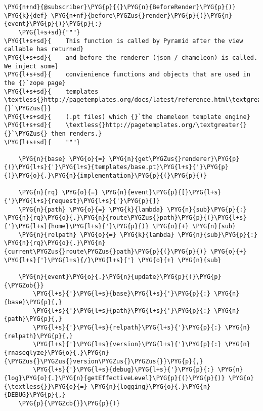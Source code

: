 \begin{Verbatim}[commandchars=\\\{\}]
\PYG{n+nd}{@subscriber}\PYG{p}{(}\PYG{n}{BeforeRender}\PYG{p}{)}
\PYG{k}{def} \PYG{n+nf}{before\PYGZus{}render}\PYG{p}{(}\PYG{n}{event}\PYG{p}{)}\PYG{p}{:}
    \PYG{l+s+sd}{"""}
\PYG{l+s+sd}{    This function is called by Pyramid after the view callable has returned}
\PYG{l+s+sd}{    and before the renderer (json / chameleon) is called. We inject some}
\PYG{l+s+sd}{    convienience functions and objects that are used in the {}`zope page}
\PYG{l+s+sd}{    templates \textless{}http://pagetemplates.org/docs/latest/reference.html\textgreater{}{}`\PYGZus{}}
\PYG{l+s+sd}{    (.pt files) which {}`the chameleon template engine}
\PYG{l+s+sd}{    \textless{}http://pagetemplates.org/\textgreater{}{}`\PYGZus{} then renders.}
\PYG{l+s+sd}{    """}

    \PYG{n}{base} \PYG{o}{=} \PYG{n}{get\PYGZus{}renderer}\PYG{p}{(}\PYG{l+s}{'}\PYG{l+s}{templates/base.pt}\PYG{l+s}{'}\PYG{p}{)}\PYG{o}{.}\PYG{n}{implementation}\PYG{p}{(}\PYG{p}{)}

    \PYG{n}{rq} \PYG{o}{=} \PYG{n}{event}\PYG{p}{[}\PYG{l+s}{'}\PYG{l+s}{request}\PYG{l+s}{'}\PYG{p}{]}
    \PYG{n}{path} \PYG{o}{=} \PYG{k}{lambda} \PYG{n}{sub}\PYG{p}{:} \PYG{n}{rq}\PYG{o}{.}\PYG{n}{route\PYGZus{}path}\PYG{p}{(}\PYG{l+s}{'}\PYG{l+s}{home}\PYG{l+s}{'}\PYG{p}{)} \PYG{o}{+} \PYG{n}{sub}
    \PYG{n}{relpath} \PYG{o}{=} \PYG{k}{lambda} \PYG{n}{sub}\PYG{p}{:} \PYG{n}{rq}\PYG{o}{.}\PYG{n}{current\PYGZus{}route\PYGZus{}path}\PYG{p}{(}\PYG{p}{)} \PYG{o}{+} \PYG{l+s}{'}\PYG{l+s}{/}\PYG{l+s}{'} \PYG{o}{+} \PYG{n}{sub}

    \PYG{n}{event}\PYG{o}{.}\PYG{n}{update}\PYG{p}{(}\PYG{p}{\PYGZob{}}
        \PYG{l+s}{'}\PYG{l+s}{base}\PYG{l+s}{'}\PYG{p}{:} \PYG{n}{base}\PYG{p}{,}
        \PYG{l+s}{'}\PYG{l+s}{path}\PYG{l+s}{'}\PYG{p}{:} \PYG{n}{path}\PYG{p}{,}
        \PYG{l+s}{'}\PYG{l+s}{relpath}\PYG{l+s}{'}\PYG{p}{:} \PYG{n}{relpath}\PYG{p}{,}
        \PYG{l+s}{'}\PYG{l+s}{version}\PYG{l+s}{'}\PYG{p}{:} \PYG{n}{rnaseqlyze}\PYG{o}{.}\PYG{n}{\PYGZus{}\PYGZus{}version\PYGZus{}\PYGZus{}}\PYG{p}{,}
        \PYG{l+s}{'}\PYG{l+s}{debug}\PYG{l+s}{'}\PYG{p}{:} \PYG{n}{log}\PYG{o}{.}\PYG{n}{getEffectiveLevel}\PYG{p}{(}\PYG{p}{)} \PYG{o}{\textless{}}\PYG{o}{=} \PYG{n}{logging}\PYG{o}{.}\PYG{n}{DEBUG}\PYG{p}{,}
    \PYG{p}{\PYGZcb{}}\PYG{p}{)}
\end{Verbatim}


